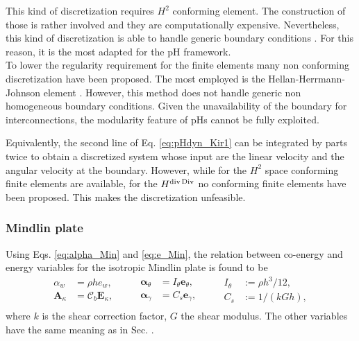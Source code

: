 This kind of discretization requires $H^2$ conforming element. The construction of those is rather involved \cite{argyris1968,bell1969} and they are computationally expensive. Nevertheless, this kind of discretization is able to handle generic boundary conditions \cite{gustafsson2018}. For this reason, it is the most adapted for the pH framework. \\

To lower the regularity requirement for the finite elements many non conforming discretization have been proposed. The most employed is the Hellan-Herrmann-Johnson element \cite{arnold1985mixed,blum1990}. However, this method does not handle generic non homogeneous boundary conditions. Given the unavailability of the boundary for interconnections, the modularity feature of pHs cannot be fully exploited. \\

\begin{remark}\label{rmk:HdivDiv}
	Equivalently, the second line of Eq. \eqref{eq:pHdyn_Kir1} can be integrated by parts twice to obtain a discretized system whose input are the linear velocity and the angular velocity at the boundary. However, while for the $H^2$ space conforming finite elements are available, for the $H^{\operatorname{div}\operatorname*{Div}}$ no conforming finite elements have been proposed. This makes the discretization unfeasible. 
\end{remark}

\subsubsection{Mindlin plate}
Using Eqs. \eqref{eq:alpha_Min} and \eqref{eq:e_Min}, the relation between co-energy and energy variables for the isotropic Mindlin plate is found to be
\begin{equation}
\begin{aligned}
\alpha_w &= \rho h e_w, \\
\bm{A}_{\kappa} &= \bm{\mathcal{C}}_b \bm{E}_\kappa,\\
\end{aligned} \qquad
\begin{aligned}
\bm{\alpha}_{\theta} &= I_\theta \bm{e}_\theta,\\
\bm{\alpha}_{\gamma} &= C_s \bm{e}_{\gamma}, \\
\end{aligned} \qquad
\begin{aligned}
I_\theta &:= {\rho h^3}/{12},\\
C_s &:= {1}/{(kGh)}, \\
\end{aligned}
\end{equation}
where $k$ is the shear correction factor, $G$ the shear modulus. The other variables have the same meaning as in Sec. . 

